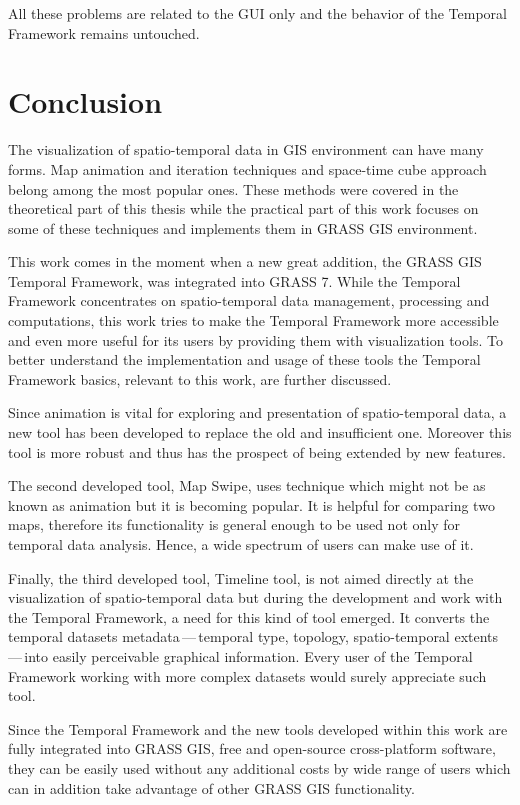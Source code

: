 \documentclass[a4paper,12pt,oneside]{book}
\newcommand{\tf}{Temporal Framework\xspace}
\newcommand{\ms}{Map Swipe\xspace}
\newcommand{\dash}{\mbox{\,---\,}}
\begin{document}
All these problems are related to the GUI only and the behavior of the \tf
remains untouched.

\cleardoublepage

\chapter*{Conclusion}

The visualization of spatio-temporal data in GIS environment can have many forms.
Map animation and iteration techniques and space-time cube approach belong among the most popular ones.
These methods were covered in the theoretical part of this thesis
while the practical part of this work focuses on some of these techniques
and implements them in GRASS GIS environment.

This work comes in the moment when a new great addition, the GRASS GIS \tf, was integrated into GRASS 7.
While the \tf concentrates on spatio-temporal data management, processing and computations, this work
tries to make the \tf more accessible and even more useful for its users by providing them with visualization
tools. To better understand the implementation and usage of these tools
the \tf basics, relevant to this work, are further discussed.

Since animation is vital for exploring and presentation of spatio-temporal data, a new tool has been developed
to replace the old and insufficient one. Moreover this tool is more robust
and thus has the prospect of being extended by new features.

The second developed tool, \ms, uses technique which might not be as known as animation
but it is becoming popular. It is helpful for comparing two maps, therefore its functionality
is general enough to be used not only for temporal data analysis.
Hence, a wide spectrum of users can make use of it.

Finally, the third developed tool, Timeline tool, is not aimed directly at the visualization of spatio-temporal data
but during the development and work with the \tf, a need for this kind of tool emerged.
It converts the temporal datasets metadata\dash temporal type, topology,
spatio-temporal extents\dash into easily perceivable graphical information.
Every user of the \tf working with more complex datasets would surely appreciate such tool.

Since the \tf and the new tools developed within this work are fully integrated into
GRASS GIS, free and open-source cross-platform software, they can be easily used
without any additional costs by wide range of users which can in addition take advantage
of other GRASS GIS functionality.
\end{document}
